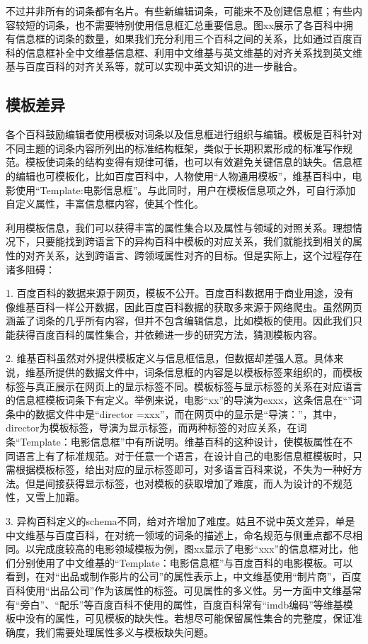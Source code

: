 不过并非所有的词条都有名片。有些新编辑词条，可能来不及创建信息框；有些内容较短的词条，也不需要特别使用信息框汇总重要信息。图xx展示了各百科中拥有信息框的词条的数量，如果我们充分利用三个百科之间的关系，比如通过百度百科的信息框补全中文维基信息框、利用中文维基与英文维基的对齐关系找到英文维基与百度百科的对齐关系等，就可以实现中英文知识的进一步融合。

\subsection{模板差异}

各个百科鼓励编辑者使用模板对词条以及信息框进行组织与编辑。模板是百科针对不同主题的词条内容所列出的标准结构框架，类似于长期积累形成的标准写作规范。模板使词条的结构变得有规律可循，也可以有效避免关键信息的缺失。信息框的编辑也可模板化，比如百度百科中，人物使用“人物通用模板”，维基百科中，电影使用“Template:电影信息框”。与此同时，用户在模板信息项之外，可自行添加自定义属性，丰富信息框内容，使其个性化。

利用模板信息，我们可以获得丰富的属性集合以及属性与领域的对照关系。理想情况下，只要能找到跨语言下的异构百科中模板的对应关系，我们就能找到相关的属性的对齐关系，达到跨语言、跨领域属性对齐的目标。但是实际上，这个过程存在诸多阻碍：

1.  百度百科的数据来源于网页，模板不公开。百度百科数据用于商业用途，没有像维基百科一样公开数据，因此百度百科数据的获取多来源于网络爬虫。虽然网页涵盖了词条的几乎所有内容，但并不包含编辑信息，比如模板的使用。因此我们只能获得百度百科的属性集合，并依赖进一步的研究方法，猜测模板内容。

2.  维基百科虽然对外提供模板定义与信息框信息，但数据却差强人意。具体来说，维基所提供的数据文件中，词条信息框的内容是以模板标签来组织的，而模板标签与真正展示在网页上的显示标签不同。模板标签与显示标签的关系在对应语言的信息框模板词条下有定义。举例来说，电影“xx”的导演为exxx，这条信息在“”词条中的数据文件中是“director =xxx”，而在网页中的显示是“导演：”，其中，director为模板标签，导演为显示标签，而两种标签的对应关系，在词条“Template：电影信息框”中有所说明。维基百科的这种设计，使模板属性在不同语言上有了标准规范。对于任意一个语言，在设计自己的电影信息框模板时，只需根据模板标签，给出对应的显示标签即可，对多语言百科来说，不失为一种好方法。但是间接获得显示标签，也对模板的获取增加了难度，而人为设计的不规范性，又雪上加霜。

3.  异构百科定义的schema不同，给对齐增加了难度。姑且不说中英文差异，单是中文维基与百度百科，在对统一领域的词条的描述上，命名规范与侧重点都不尽相同。以完成度较高的电影领域模板为例，图xx显示了电影“xxx”的信息框对比，他们分别使用了中文维基的“Template：电影信息框”与百度百科的电影模板。可以看到，在对“出品或制作影片的公司”的属性表示上，中文维基使用“制片商”，百度百科使用“出品公司”作为该属性的标签。可见属性的多义性。另一方面中文维基常有“旁白”、“配乐”等百度百科不使用的属性，百度百科常有“imdb编码”等维基模板中没有的属性，可见模板的缺失性。若想尽可能保留属性集合的完整度，保证准确度，我们需要处理属性多义与模板缺失问题。

